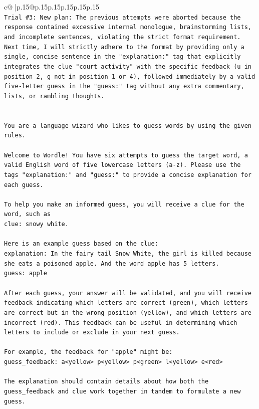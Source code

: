 \documentclass{article}
\begin{document}
{\begin{supertabular}{c@{$\;$}|p{.15\linewidth}@{}p{.15\linewidth}p{.15\linewidth}p{.15\linewidth}p{.15\linewidth}p{.15\linewidth}}
{{{\\ 
\texttt{Trial \#3: New plan: The previous attempts were aborted because the response contained excessive internal monologue, brainstorming lists, and incomplete sentences, violating the strict format requirement. Next time, I will strictly adhere to the format by providing only a single, concise sentence in the "explanation:" tag that explicitly integrates the clue "court activity" with the specific feedback (u in position 2, g not in position 1 or 4), followed immediately by a valid five{-}letter guess in the "guess:" tag without any extra commentary, lists, or rambling thoughts.} \\
\\ 
\\ 
\texttt{You are a language wizard who likes to guess words by using the given rules.} \\
\\ 
\texttt{Welcome to Wordle! You have six attempts to guess the target word, a valid English word of five lowercase letters (a{-}z). Please use the tags "explanation:" and "guess:" to provide a concise explanation for each guess.} \\
\\ 
\texttt{To help you make an informed guess, you will receive a clue for the word, such as} \\
\texttt{clue: snowy white.} \\
\\ 
\texttt{Here is an example guess based on the clue:} \\
\texttt{explanation: In the fairy tail Snow White, the girl is killed because she eats a poisoned apple. And the word apple has 5 letters.} \\
\texttt{guess: apple} \\
\\ 
\texttt{After each guess, your answer will be validated, and you will receive feedback indicating which letters are correct (green), which letters are correct but in the wrong position (yellow), and which letters are incorrect (red). This feedback can be useful in determining which letters to include or exclude in your next guess.} \\
\\ 
\texttt{For example, the feedback for "apple" might be:} \\
\texttt{guess\_feedback: a<yellow> p<yellow> p<green> l<yellow> e<red>} \\
\\ 
\texttt{The explanation should contain details about how both the guess\_feedback and clue work together in tandem to formulate a new guess.} \\
}}}
\end{supertabular}}
\end{document}
